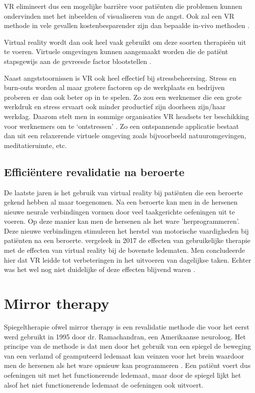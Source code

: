 VR elimineert dus een mogelijke barrière voor patiënten die problemen kunnen ondervinden met het inbeelden of visualiseren van de angst. Ook zal een VR methode in vele gevallen kostenbesparender zijn dan bepaalde in-vivo methoden \autocite{Keller2018}.

Virtual reality wordt dan ook heel vaak gebruikt om deze soorten therapieën uit te voeren. Virtuele omgevingen kunnen aangemaakt worden die de patiënt stapsgewijs aan de gevreesde factor blootstellen \autocite{Keller2018}.

Naast angststoornissen is VR ook heel effectief bij stressbeheersing. Stress en burn-outs worden al maar grotere factoren op de werkplaats en bedrijven proberen er dan ook beter op in te spelen. Zo zou een werknemer die een grote werkdruk en stress ervaart ook minder productief zijn doorheen zijn/haar werkdag. Daarom stelt men in sommige organisaties VR headsets ter beschikking voor werknemers om te ‘ontstressen’ \autocite{Thoondee2017}.  
Zo een ontspannende applicatie bestaat dan uit een relaxerende virtuele omgeving zoals bijvoorbeeld natuuromgevingen, meditatieruimte, etc.

\subsection{Efficiëntere revalidatie na beroerte}  
De laatste jaren is het gebruik van virtual reality bij patiënten die een beroerte gekend hebben al maar toegenomen. Na een beroerte kan men in de hersenen nieuwe neurale verbindingen vormen door veel taakgerichte oefeningen uit te voeren. Op deze manier kan men de hersenen als het ware 'herprogrammeren'. Deze nieuwe verbindingen stimuleren het herstel van motorische vaardigheden bij patiënten na een beroerte. \textcite{Laver2017} vergeleek in 2017 de effecten van gebruikelijke therapie met de effecten van virtual reality bij de bovenste ledematen. Men concludeerde hier dat VR leidde tot verbeteringen in het uitvoeren van dagelijkse taken. Echter was het wel nog niet duidelijke of deze effecten blijvend waren \autocite{Laver2017}.

\section{Mirror therapy}
Spiegeltherapie ofwel mirror therapy is een revalidatie methode die voor het eerst werd gebruikt in 1995 door dr. Ramachandran, een Amerikaanse neuroloog. Het principe van de methode is dat men door het gebruik van een spiegel de beweging van een verlamd of geamputeerd ledemaat kan veinzen voor het brein waardoor men de hersenen als het ware opnieuw kan programmeren \autocite{Physiopedia2019}.
Een patiënt voert dus oefeningen uit met het functionerende ledemaat, maar door de spiegel lijkt het alsof het niet functionerende ledemaat de oefeningen ook uitvoert.

